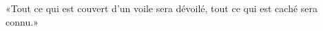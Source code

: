\encetempsla \jesusdisciples
	«Tout ce qui est couvert d’un voile sera dévoilé,
	tout ce qui est caché sera connu.»
